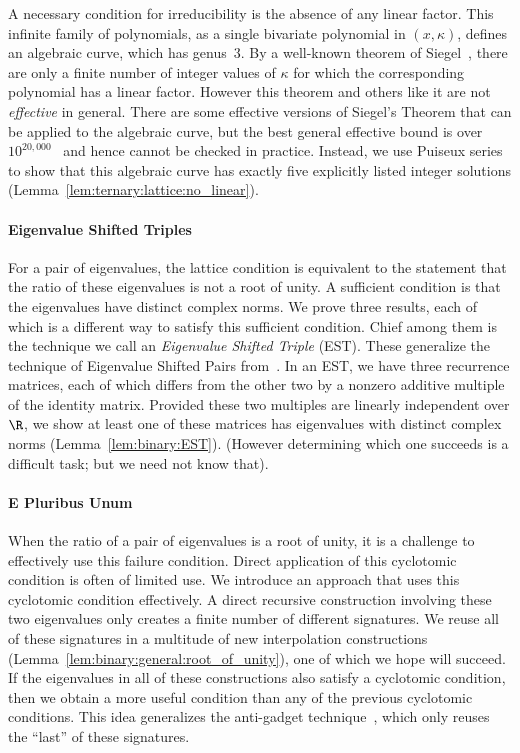 \documentclass[11pt]{article}
\begin{document}
A necessary condition for irreducibility is the absence of any linear factor.
This infinite family of polynomials,
as a single bivariate polynomial in $(x, \kappa)$,
defines an algebraic curve,
which has genus~$3$.
By a well-known theorem of Siegel~\cite{Sie29},
there are only a finite number of integer values of $\kappa$ for which the corresponding polynomial has a linear factor.
However this theorem and others like it are not \emph{effective} in general.
There are some effective versions of Siegel's Theorem that can be applied to the algebraic curve,
but the best general effective bound is over $10^{20,000}$~\cite{Wal92} and hence cannot be checked in practice.
Instead, we use Puiseux series to show that this algebraic curve has exactly five explicitly listed integer solutions (Lemma~\ref{lem:ternary:lattice:no_linear}).

\paragraph{Eigenvalue Shifted Triples}
For a pair of eigenvalues,
the lattice condition is equivalent to the statement that the ratio of these eigenvalues is not a root of unity.
A sufficient condition is that the eigenvalues have distinct complex norms.
We prove three results,
each of which is a different way to satisfy this sufficient condition.
Chief among them is the technique we call an \emph{Eigenvalue Shifted Triple} (EST).
These generalize the technique of Eigenvalue Shifted Pairs from~\cite{KC10}.
In an EST,
we have three recurrence matrices,
each of which differs from the other two by a nonzero additive multiple of the identity matrix.
Provided these two multiples are linearly independent over $\R$,
we show at least one of these matrices has eigenvalues with distinct complex norms (Lemma~\ref{lem:binary:EST}).
(However determining which one succeeds is a difficult task;
but we need not know that).

\paragraph{E Pluribus Unum}
When the ratio of a pair of eigenvalues is a root of unity,
it is a challenge to effectively use this failure condition.
Direct application of this cyclotomic condition is often of limited use.
We introduce an approach that uses this cyclotomic condition effectively.
A direct recursive construction involving these two eigenvalues only creates a finite number of different signatures.
We reuse all of these signatures in a multitude of new interpolation constructions (Lemma~\ref{lem:binary:general:root_of_unity}),
one of which we hope will succeed.
If the eigenvalues in all of these constructions also satisfy a cyclotomic condition,
then we obtain a more useful condition than any of the previous cyclotomic conditions.
This idea generalizes the anti-gadget technique~\cite{CKW12},
which only reuses the ``last'' of these signatures.
\end{document}
